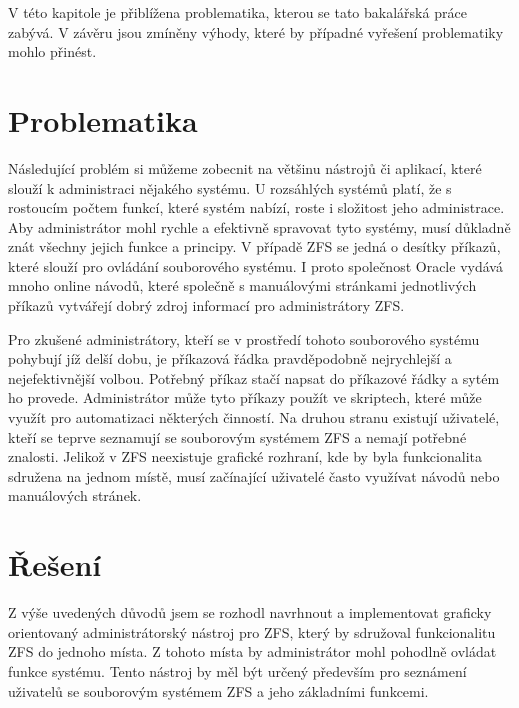 V této kapitole je přiblížena problematika, kterou se tato bakalářská práce zabývá. V závěru jsou zmíněny výhody, které by případné vyřešení problematiky mohlo přinést.

\section{Problematika}
Následující problém si můžeme zobecnit na většinu nástrojů či aplikací, které slouží k administraci nějakého systému. U rozsáhlých systémů platí, že s rostoucím počtem funkcí, které systém nabízí, roste i složitost jeho administrace. Aby administrátor mohl rychle a efektivně spravovat tyto systémy, musí důkladně znát všechny jejich funkce a principy. V případě ZFS se jedná o desítky příkazů, které slouží pro ovládání souborového systému. I proto společnost Oracle vydává mnoho online návodů, které společně s manuálovými stránkami jednotlivých příkazů vytvářejí dobrý zdroj informací pro administrátory ZFS.

Pro zkušené administrátory, kteří se v prostředí tohoto souborového systému pohybují jíž delší dobu, je příkazová řádka pravděpodobně nejrychlejší a nejefektivnější volbou. Potřebný příkaz stačí napsat do příkazové řádky a sytém ho provede. Administrátor může tyto příkazy použít ve skriptech, které může využít pro automatizaci některých činností. Na druhou stranu existují uživatelé, kteří se teprve seznamují se souborovým systémem ZFS a nemají potřebné znalosti. Jelikož v ZFS neexistuje grafické rozhraní, kde by byla funkcionalita sdružena na jednom místě, musí začínající uživatelé často využívat návodů nebo manuálových stránek.
\section{Řešení}
Z výše uvedených důvodů jsem se rozhodl navrhnout a implementovat graficky orientovaný administrátorský nástroj pro ZFS, který by sdružoval funkcionalitu ZFS do jednoho místa. Z tohoto místa by administrátor mohl pohodlně ovládat funkce systému. Tento nástroj by měl být určený především pro seznámení uživatelů se souborovým systémem ZFS a jeho základními funkcemi.
